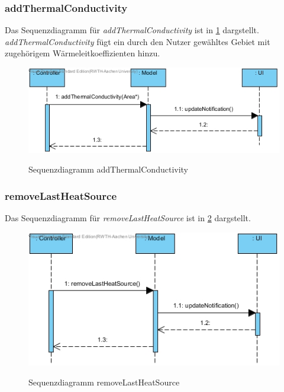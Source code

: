 \subsubsection*{addThermalConductivity}

Das Sequenzdiagramm für \emph{addThermalConductivity} ist in \ref{Sequenzdiagramm addThermalConductivity} dargstellt. \emph{addThermalConductivity} fügt ein durch den Nutzer gewähltes Gebiet mit zugehörigem Wärmeleitkoeffizienten hinzu.

\begin{figure}[H]
	\centering
	\includegraphics[scale=.6]{Bilder/Model__addThermalConductivity().jpg}\\
	\caption{Sequenzdiagramm addThermalConductivity}
	\label{Sequenzdiagramm addThermalConductivity}
\end{figure}

\subsubsection*{removeLastHeatSource}

Das Sequenzdiagramm für \emph{removeLastHeatSource} ist in \ref{Sequenzdiagramm removeLastHeatSource} dargstellt.

\begin{figure}[H]
	\centering
	\includegraphics[scale=.6]{Bilder/Model__removeLastHeatSource().jpg}\\
	\caption{Sequenzdiagramm removeLastHeatSource}
	\label{Sequenzdiagramm removeLastHeatSource}
\end{figure}

